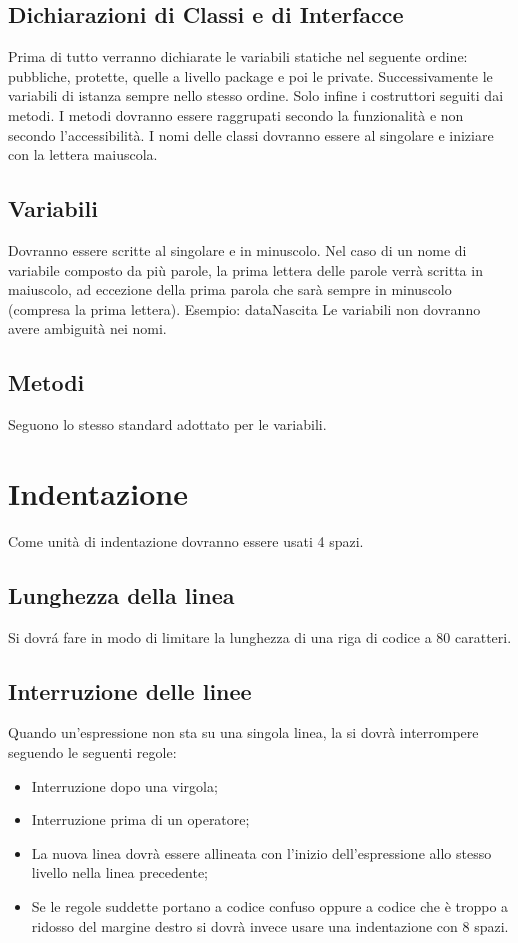 \subsection{Dichiarazioni di Classi e di Interfacce}
Prima di tutto verranno dichiarate le variabili statiche nel seguente ordine: pubbliche, protette, quelle a livello package e poi le private. Successivamente le variabili di istanza sempre nello stesso ordine. Solo infine i costruttori seguiti dai metodi. I metodi dovranno essere raggrupati secondo la funzionalit\`a e non secondo l'accessibilit\`a. I nomi delle classi dovranno essere al singolare e iniziare con la lettera maiuscola.
\subsection{Variabili}
Dovranno essere scritte al singolare e in minuscolo. Nel caso di un nome di variabile composto da pi\`u parole, la prima lettera delle parole verr\`a scritta in maiuscolo, ad eccezione della prima parola che sar\`a sempre in minuscolo (compresa la prima lettera). \newline
Esempio: dataNascita \newline
Le variabili non dovranno avere ambiguit\`a nei nomi.
\subsection{Metodi}
Seguono lo stesso standard adottato per le variabili.

\section{Indentazione}
Come unit\`a di indentazione dovranno essere usati 4 spazi.
\subsection{Lunghezza della linea}
Si dovr\'a fare in modo di limitare la lunghezza di una riga di codice a 80 caratteri.
\subsection{Interruzione delle linee}
Quando un'espressione non sta su una singola linea, la si dovr\`a interrompere seguendo le seguenti regole:
\begin{itemize}
\item Interruzione dopo una virgola;
\item Interruzione prima di un operatore;
\item La nuova linea dovr\`a essere allineata con l'inizio dell'espressione allo stesso livello nella linea precedente;
\item Se le regole suddette portano a codice confuso oppure a codice che è troppo a ridosso del margine destro si dovr\`a invece usare una indentazione con 8 spazi.
\end{itemize}


